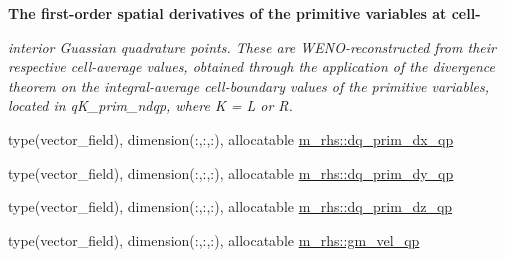 \begin{Indent}\textbf{ The first-\/order spatial derivatives of the primitive variables at cell-\/}\par
{\em interior Guassian quadrature points. These are W\+E\+N\+O-\/reconstructed from their respective cell-\/average values, obtained through the application of the divergence theorem on the integral-\/average cell-\/boundary values of the primitive variables, located in q\+K\+\_\+prim\+\_\+ndqp, where K = L or R. }\begin{DoxyCompactItemize}
\item 
type(vector\+\_\+field), dimension(\+:,\+:,\+:), allocatable \hyperlink{namespacem__rhs_a48f3d69bb519043ca76fb10f8a2f44c0}{m\+\_\+rhs\+::dq\+\_\+prim\+\_\+dx\+\_\+qp}
\item 
type(vector\+\_\+field), dimension(\+:,\+:,\+:), allocatable \hyperlink{namespacem__rhs_aa727628a4ae8fa3af715f416b7bcadbe}{m\+\_\+rhs\+::dq\+\_\+prim\+\_\+dy\+\_\+qp}
\item 
type(vector\+\_\+field), dimension(\+:,\+:,\+:), allocatable \hyperlink{namespacem__rhs_a145666708445ab1fa66bb58fa248b0c1}{m\+\_\+rhs\+::dq\+\_\+prim\+\_\+dz\+\_\+qp}
\item 
type(vector\+\_\+field), dimension(\+:,\+:,\+:), allocatable \hyperlink{namespacem__rhs_ae49e4c2622ff0adf0b066da12e8256c8}{m\+\_\+rhs\+::gm\+\_\+vel\+\_\+qp}
\end{DoxyCompactItemize}
\end{Indent}
